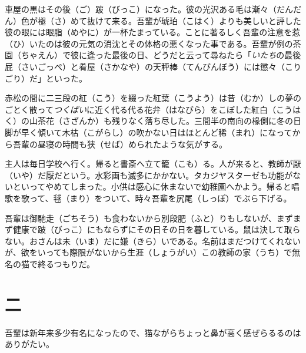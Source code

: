 \documentclass{book}
\begin{document}
車屋の黒はその後（ご）跛（びっこ）になった。彼の光沢ある毛は漸々（だんだん）色が褪（さ）めて抜けて来る。吾輩が琥珀（こはく）よりも美しいと評した彼の眼には眼脂（めやに）が一杯たまっている。ことに著るしく吾輩の注意を惹（ひ）いたのは彼の元気の消沈とその体格の悪くなった事である。吾輩が例の茶園（ちゃえん）で彼に逢った最後の日、どうだと云って尋ねたら「\emph{いたち}の最後屁（さいごっぺ）と肴屋（さかなや）の天秤棒（てんびんぼう）には懲々（こりごり）だ」といった。

赤松の間に二三段の紅（こう）を綴った紅葉（こうよう）は昔（むか）しの夢のごとく散って\emph{つくばい}に近く代る代る花弁（はなびら）をこぼした紅白（こうはく）の山茶花（さざんか）も残りなく落ち尽した。三間半の南向の椽側に冬の日脚が早く傾いて木枯（こがらし）の吹かない日はほとんど稀（まれ）になってから吾輩の昼寝の時間も狭（せば）められたような気がする。

主人は毎日学校へ行く。帰ると書斎へ立て籠（こも）る。人が来ると、教師が厭（いや）だ厭だという。水彩画も滅多にかかない。タカジヤスターゼも功能がないといってやめてしまった。小供は感心に休まないで幼稚園へかよう。帰ると唱歌を歌って、毬（まり）をついて、時々吾輩を尻尾（しっぽ）でぶら下げる。

吾輩は御馳走（ごちそう）も食わないから別段肥（ふと）りもしないが、まずまず健康で跛（びっこ）にもならずにその日その日を暮している。鼠は決して取らない。おさんは未（いま）だに嫌（きら）いである。名前はまだつけてくれないが、欲をいっても際限がないから生涯（しょうがい）この教師の家（うち）で無名の猫で終るつもりだ。

\chapter*{\centering 二}

吾輩は新年来多少有名になったので、猫ながらちょっと鼻が高く感ぜらるるのはありがたい。
\end{document}
